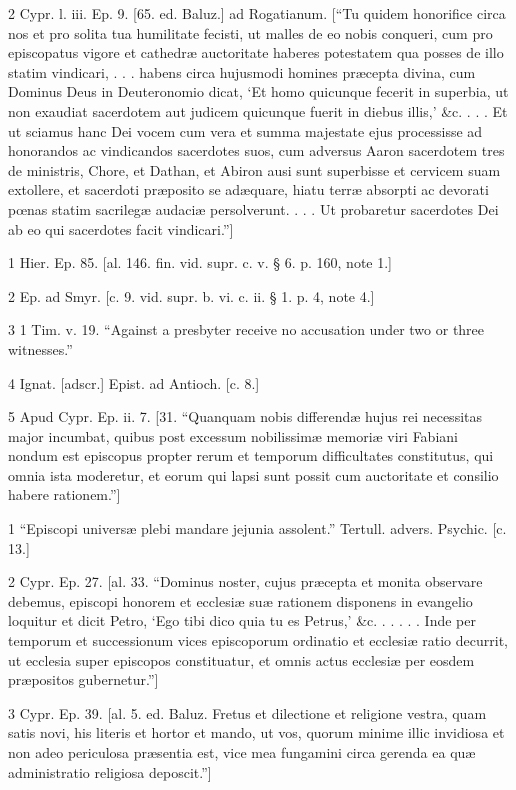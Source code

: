2
Cypr. l. iii. Ep. 9. [65. ed. Baluz.] ad Rogatianum. [“Tu quidem honorifice circa nos et pro solita tua humilitate fecisti, ut malles de eo nobis conqueri, cum pro episcopatus vigore et cathedræ auctoritate haberes potestatem qua posses de illo statim vindicari, . . . habens circa hujusmodi homines præcepta divina, cum Dominus Deus in Deuteronomio dicat, ‘Et homo quicunque fecerit in superbia, ut non exaudiat sacerdotem aut judicem quicunque fuerit in diebus illis,’ &c. . . . Et ut sciamus hanc Dei vocem cum vera et summa majestate ejus processisse ad honorandos ac vindicandos sacerdotes suos, cum adversus Aaron sacerdotem tres de ministris, Chore, et Dathan, et Abiron ausi sunt superbisse et cervicem suam extollere, et sacerdoti præposito se adæquare, hiatu terræ absorpti ac devorati pœnas statim sacrilegæ audaciæ persolverunt. . . . Ut probaretur sacerdotes Dei ab eo qui sacerdotes facit vindicari.”]

1
Hier. Ep. 85. [al. 146. fin. vid. supr. c. v. § 6. p. 160, note 1.]

2
Ep. ad Smyr. [c. 9. vid. supr. b. vi. c. ii. § 1. p. 4, note 4.]

3
1 Tim. v. 19. “Against a presbyter receive no accusation under two or three witnesses.”

4
Ignat. [adscr.] Epist. ad Antioch. [c. 8.]

5
Apud Cypr. Ep. ii. 7. [31. “Quanquam nobis differendæ hujus rei necessitas major incumbat, quibus post excessum nobilissimæ memoriæ viri Fabiani nondum est episcopus propter rerum et temporum difficultates constitutus, qui omnia ista moderetur, et eorum qui lapsi sunt possit cum auctoritate et consilio habere rationem.”]

1
“Episcopi universæ plebi mandare jejunia assolent.” Tertull. advers. Psychic. [c. 13.]

2
Cypr. Ep. 27. [al. 33. “Dominus noster, cujus præcepta et monita observare debemus, episcopi honorem et ecclesiæ suæ rationem disponens in evangelio loquitur et dicit Petro, ‘Ego tibi dico quia tu es Petrus,’ &c. . . . . . Inde per temporum et successionum vices episcoporum ordinatio et ecclesiæ ratio decurrit, ut ecclesia super episcopos constituatur, et omnis actus ecclesiæ per eosdem præpositos gubernetur.”]

3
Cypr. Ep. 39. [al. 5. ed. Baluz. Fretus et dilectione et religione vestra, quam satis novi, his literis et hortor et mando, ut vos, quorum minime illic invidiosa et non adeo periculosa præsentia est, vice mea fungamini circa gerenda ea quæ administratio religiosa deposcit.”]

